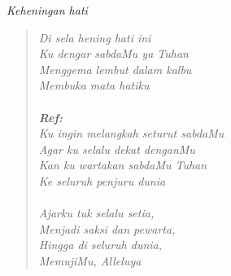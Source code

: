 \small
\begin{center}
\itshape{Keheningan hati}
\end{center}

\begin{verse}
\itshape{
Di sela hening hati ini\\
Ku dengar sabdaMu ya Tuhan\\
Menggema lembut dalam kalbu\\
Membuka mata hatiku\\
{~}\\
\textbf{Ref:}\\
Ku ingin melangkah seturut sabdaMu\\
Agar ku selalu dekat denganMu\\
Kan ku wartakan sabdaMu Tuhan\\
Ke seluruh penjuru dunia\\
{~}\\
Ajarku tuk selalu setia,\\
Menjadi saksi dan pewarta,\\
Hingga di seluruh dunia, \\
MemujiMu, Alleluya 
}
\end{verse}
\normalsize

